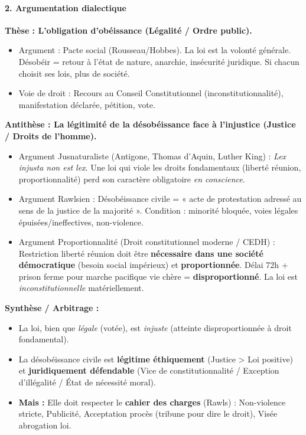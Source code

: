 \documentclass[11pt]{article}
\begin{document}
\begin{exoresolu}
    \paragraph{2. Argumentation dialectique}
    \textbf{Thèse : L'obligation d'obéissance (Légalité / Ordre public).}
    \begin{itemize}
        \item Argument : Pacte social (Rousseau/Hobbes). La loi est la volonté générale. Désobéir = retour à l'état de nature, anarchie, insécurité juridique. Si chacun choisit ses lois, plus de société.
        \item Voie de droit : Recours au Conseil Constitutionnel (inconstitutionnalité), manifestation déclarée, pétition, vote.
    \end{itemize}
    \textbf{Antithèse : La légitimité de la désobéissance face à l'injustice (Justice / Droits de l'homme).}
    \begin{itemize}
        \item Argument Jusnaturaliste (Antigone, Thomas d'Aquin, Luther King) : \emph{Lex injusta non est lex}. Une loi qui viole les droits fondamentaux (liberté réunion, proportionnalité) perd son caractère obligatoire \emph{en conscience}.
        \item Argument Rawlsien : Désobéissance civile = « acte de protestation adressé au sens de la justice de la majorité ». Condition : minorité bloquée, voies légales épuisées/ineffectives, non-violence.
        \item Argument Proportionnalité (Droit constitutionnel moderne / CEDH) : Restriction liberté réunion doit être \textbf{nécessaire dans une société démocratique} (besoin social impérieux) et \textbf{proportionnée}. Délai 72h + prison ferme pour marche pacifique vie chère = \textbf{disproportionné}. La loi est \emph{inconstitutionnelle} matériellement.
    \end{itemize}
    \textbf{Synthèse / Arbitrage :}
    \begin{itemize}
        \item La loi, bien que \emph{légale} (votée), est \emph{injuste} (atteinte disproportionnée à droit fondamental).
        \item La désobéissance civile est \textbf{légitime éthiquement} (Justice > Loi positive) et \textbf{juridiquement défendable} (Vice de constitutionnalité / Exception d'illégalité / État de nécessité moral).
        \item \textbf{Mais :} Elle doit respecter le \textbf{cahier des charges} (Rawls) : Non-violence stricte, Publicité, Acceptation procès (tribune pour dire le droit), Visée abrogation loi.
    \end{itemize}

\end{exoresolu}
\end{document}
